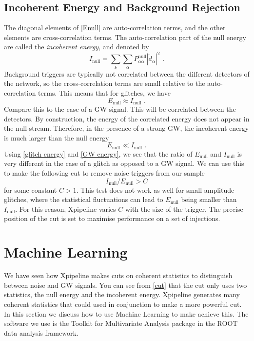 \documentclass[11pt]{cuthesis}
\newcommand{\fs}{\text{ .}}
\begin{document}
\subsection{Incoherent Energy and Background Rejection}
The diagonal elements of \ref{Enull} are auto-correlation terms, and the other elements are cross-correlation terms. The auto-correlation part of the null energy are called the \textit{incoherent energy}, and denoted by
\begin{equation}
I_\text{null} = \sum_k \sum_\alpha P^\text{null}_{\alpha \alpha} | \tilde{d}_\alpha |^2 \fs
\end{equation}
Background triggers are typically not correlated between the different detectors of the network, so the cross-correlation terms are small relative to the auto-correlation terms. This means that for glitches, we have
\begin{equation} \label{glitch energy}
E_\text{null} \approx I_\text{null} \fs
\end{equation} 
Compare this to the case of a GW signal. This will be correlated between the detectors. By construction, the energy of the correlated energy does not appear in the null-stream. Therefore, in the presence of a strong GW, the incoherent energy is much larger than the null energy 
\begin{equation} \label{GW energy}
E_\text{null} \ll I_\text{null} \fs
\end{equation}
Using \ref{glitch energy} and \ref{GW energy}, we see that the ratio of $E_\text{null}$ and $I_\text{null}$ is very different in the case of a glitch as opposed to a GW signal. We can use this to make the following cut to remove noise triggers from our sample
\begin{equation} \label{cut}
I_\text{null} / E_\text{null} > C
\end{equation}
for some constant $C>1$. This test does not work as well for small amplitude glitches, where the statistical fluctuations can lead to $E_\text{null}$ being smaller than $I_\text{null}$. For this reason, Xpipeline varies $C$ with the size of the trigger. The precise position of the cut is set to maximise performance on a set of injections.  

\section{\label{ML}Machine Learning}
We have seen how Xpipeline makes cuts on coherent statistics to distinguish between noise and GW signals. You can see from \ref{cut} that the cut only uses two statistics, the null energy and the incoherent energy. Xpipeline generates many coherent statistics that could used in conjunction to make a more powerful cut. In this section we discuss how to use Machine Learning to make achieve this. The software we use is the Toolkit for Multivariate Analysis package in the ROOT data analysis framework. 
\end{document}
